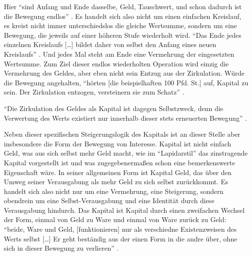 \documentclass[12pt,
               DIV13,
               paper=a4,
               twoside=false,
               onehalfspacing,
               bibliography=totoc,
               toc=graduated,
               draft,
               ]{scrartcl}
\newcommand{\lips}{\dots\unkern}
\newcommand{\pc}[2]{\parencite[#1]{#2}}
\begin{document}

Hier "`sind Anfang und Ende dasselbe, Geld, Tauschwert, und schon
dadurch ist die Bewegung endlos"' \pc{166}{kap}. Es handelt sich also
nicht um einen einfachen Kreislauf, es kreist nicht immer
unterschiedslos die gleiche Wertsumme, sondern um eine Bewegung, die
jeweils auf einer höheren Stufe wiederholt wird. "`Das Ende jedes
einzelnen Kreislaufs [\lips] bildet daher von selbst den Anfang eines
neuen Kreislaufs"' \pc{S. 166 f.}{kap}. Und jedes Mal steht am Ende
eine Vermehrung der eingesetzten Wertsumme. Zum Ziel dieser endlos
wiederholten Operation wird einzig die Vermehrung des Geldes, aber
eben nicht sein Entzug aus der Zirkulation. Würde die Bewegung
angehalten, "`hörten [die beispielhaften 100 Pfd. St.] auf, Kapital zu
sein. Der Zirkulation entzogen, versteinern sie zum Schatz"'
\pc{166}{kap}.

"`Die Zirkulation des Geldes als Kapital ist dagegen Selbstzweck, denn
die Verwertung des Werts existiert nur innerhalb dieser stets
erneuerten Bewegung"' \pc{167}{kap}.




Neben dieser spezifischen Steigerungslogik des Kapitals ist an dieser
Stelle aber insbesondere die Form der Bewegung von Interesse. Kapital
ist nicht einfach Geld, was aus sich selbst mehr Geld macht, wie im
"`Lapidarstil"' \pc{170}{kap} das zinstragende Kapital vorgestellt ist
und was zugegebenermaßen schon eine bemerkenswerte Eigenschaft wäre.
In seiner allgemeinen Form ist Kapital Geld, das über den Umweg seiner
Verausgabung als mehr Geld zu sich selbst zurückkommt. Es handelt sich
also nicht nur um eine Vermehrung, eine Steigerung, sondern obendrein
um eine Selbst-Verausgabung und eine Identität durch diese
Verausgabung hindurch. Das Kapital ist Kapital durch einen zweifachen
Wechsel der Form, einmal von Geld zu Ware und einmal von Ware zurück
zu Geld: "`beide, Ware und Geld, [funktionieren] nur als verschiedne
Existenzweisen des Werts selbst [\lips] Er geht beständig aus der
einen Form in die andre über, ohne sich in dieser Bewegung zu
verlieren"' \pc{S. 168 f.}{kap}.
\end{document}

